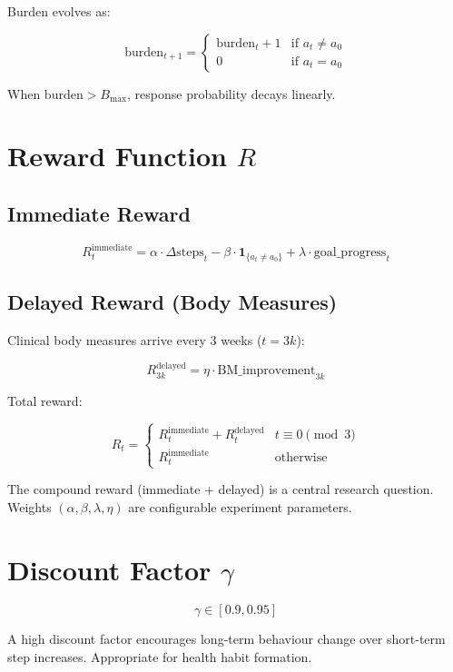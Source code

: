 \documentclass[11pt,a4paper]{article}
\begin{document}
Burden evolves as:

\[
\text{burden}_{t+1} =
\begin{cases}
\text{burden}_t + 1 & \text{if } a_t \neq a_0 \\
0 & \text{if } a_t = a_0
\end{cases}
\]

When $\text{burden} > B_{\max}$, response probability decays linearly.

\section{Reward Function $R$}
\label{sec:reward}

\subsection{Immediate Reward}

\[
R_t^{\text{immediate}} = \alpha \cdot \Delta\text{steps}_t
- \beta \cdot \mathbf{1}_{\{a_t \neq a_0\}}
+ \lambda \cdot \text{goal\_progress}_t
\]

\subsection{Delayed Reward (Body Measures)}

Clinical body measures arrive every 3 weeks ($t = 3k$):

\[
R_{3k}^{\text{delayed}} = \eta \cdot \text{BM\_improvement}_{3k}
\]

Total reward:

\[
R_t =
\begin{cases}
R_t^{\text{immediate}} + R_t^{\text{delayed}} & t \equiv 0 \pmod{3} \\
R_t^{\text{immediate}} & \text{otherwise}
\end{cases}
\]

The compound reward (immediate + delayed) is a central research question.
Weights $(\alpha, \beta, \lambda, \eta)$ are configurable experiment parameters.

\section{Discount Factor $\gamma$}

\[
\gamma \in [0.9, 0.95]
\]

A high discount factor encourages long-term behaviour change over short-term
step increases. Appropriate for health habit formation.
\end{document}
